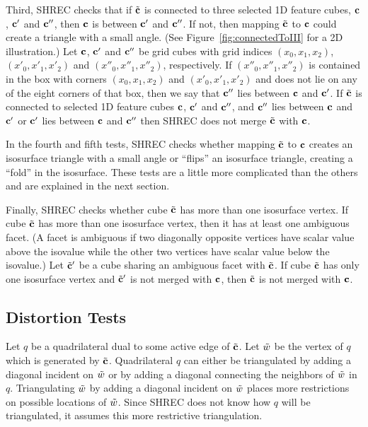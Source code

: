 Third, SHREC checks that if ${\tilde{\mathbf{c}}}$ is connected to three selected 1D feature cubes,
$\mathbf{c}$, $\mathbf{c}'$ and $\mathbf{c}''$, then $\mathbf{c}$ is between $\mathbf{c}'$ and $\mathbf{c}''$.
If not, then mapping ${\tilde{\mathbf{c}}}$ to $\mathbf{c}$ could create a triangle 
with a small angle.
(See Figure~\ref{fig:connectedToIII} for a 2D illustration.)
Let $\mathbf{c}$, $\mathbf{c}'$ and $\mathbf{c}''$ be grid cubes with grid indices
$(x_0,x_1,x_2)$, $(x'_0,x'_1,x'_2)$ and $(x''_0,x''_1,x''_2)$, respectively.
If $(x''_0,x''_1,x''_2)$ is contained in the box with corners
$(x_0,x_1,x_2)$ and $(x'_0,x'_1,x'_2)$ and does not lie on any 
of the eight corners of that box,
then we say that $\mathbf{c}''$ lies between $\mathbf{c}$ and $\mathbf{c}'$.
If ${\tilde{\mathbf{c}}}$ is connected to selected 1D feature cubes $\mathbf{c}$, $\mathbf{c}'$ and $\mathbf{c}''$,
and $\mathbf{c}''$ lies between $\mathbf{c}$ and $\mathbf{c}'$
or $\mathbf{c}'$ lies between $\mathbf{c}$ and $\mathbf{c}''$
then SHREC does not merge ${\tilde{\mathbf{c}}}$ with $\mathbf{c}$.

In the fourth and fifth tests,
SHREC checks whether mapping ${\tilde{\mathbf{c}}}$ to $\mathbf{c}$ creates an isosurface triangle 
with a small angle or ``flips'' an isosurface triangle,
creating a ``fold'' in the isosurface.
These tests are a little more complicated than the others
and are explained in the next section.

Finally, SHREC checks whether cube ${\tilde{\mathbf{c}}}$ has more than one isosurface vertex.
If cube ${\tilde{\mathbf{c}}}$ has more than one isosurface vertex,
then it has at least one ambiguous facet.
(A facet is ambiguous if two diagonally opposite vertices have
scalar value above the isovalue while the other two vertices
have scalar value below the isovalue.)
Let ${\tilde{\mathbf{c}}}'$ be a cube sharing an ambiguous facet with ${\tilde{\mathbf{c}}}$.
If cube ${\tilde{\mathbf{c}}}$ has only one isosurface vertex and 
${\tilde{\mathbf{c}}}'$ is not merged with $\mathbf{c}$, then ${\tilde{\mathbf{c}}}$ is not merged with $\mathbf{c}$.

\subsection{Distortion Tests}
\label{section:distortion_tests}

Let $q$ be a quadrilateral dual to some active edge of ${\tilde{\mathbf{c}}}$.
Let $\tilde{w}$ be the vertex of $q$ which is generated by ${\tilde{\mathbf{c}}}$.
Quadrilateral $q$ can either be triangulated by adding a diagonal
incident on $\tilde{w}$ or by adding a diagonal connecting the neighbors
of $\tilde{w}$ in $q$.
Triangulating $\tilde{w}$ by adding a diagonal incident on $\tilde{w}$
places more restrictions on possible locations of $\tilde{w}$.
Since SHREC does not know how $q$ will be triangulated,
it assumes this more restrictive triangulation.

